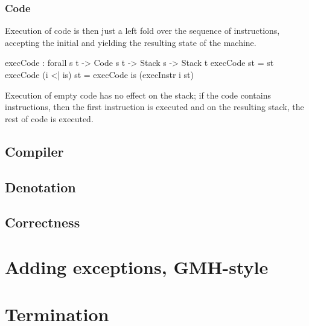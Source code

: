 \subsubsection{Code}

Execution of code is then just a left fold over the sequence of instructions,
accepting the initial and yielding the resulting state of the machine.

\begin{code}
  execCode : forall {s t} -> Code s t -> Stack s -> Stack t
  execCode \nil st = st
  execCode (i <| is) st = execCode is (execInstr i st)
\end{code}

\noindent Execution of empty code has no effect on the stack; if the code
contains instructions, then the first instruction is executed and on the
resulting stack, the rest of code is executed.

\subsection{Compiler}

\subsection{Denotation}

\subsection{Correctness}

\section{Adding exceptions, GMH-style}

\section{Termination}
